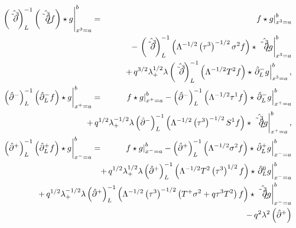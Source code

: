 \documentclass[a4paper,11pt,oneside]{article}
\begin{document}
\begin{eqnarray}
\left. \left( \hat{\tilde{\partial}^{3}}\right) _{L}^{-1}\left( \hat{\tilde{%
\partial}_{L}^{3}}f\right) \star g\right| _{x^{3}=a}^{b} &=&\left. f\star
g\right| _{x^{3}=a}^{b} \\
&&\hspace*{-3.cm}-\,\left( \hat{\tilde{\partial}^{3}}\right)
_{L}^{-1}\left( \Lambda ^{-1/2}\left( \tau ^{3}\right) ^{-1/2}\sigma
^{2}f\right) \star \left. \hat{\tilde{\partial}_{L}^{3}}g\right|
_{x^{3}=a}^{b}  \nonumber \\
&&\hspace*{-3.cm}+\,q^{3/2}\lambda _{+}^{1/2}\lambda \left( \hat{\tilde{%
\partial}^{3}}\right) _{L}^{-1}\left( \Lambda ^{-1/2}T^{2}f\right) \star
\left. \hat{\partial}_{L}^{-}g\right| _{x^{3}=a}^{b},  \nonumber \\
\left. \left( \hat{\partial}^{-}\right) _{L}^{-1}\left( \hat{\partial}%
_{L}^{-}f\right) \star g\right| _{x^{+}=a}^{b} &=&\left. f\star g\right|
_{x^{+}=a}^{b}-\left( \hat{\partial}^{-}\right) _{L}^{-1}\left( \Lambda
^{-1/2}\tau ^{1}f\right) \star \left. \hat{\partial}_{L}^{-}g\right|
_{x^{+}=a}^{b}  \nonumber \\
&&\hspace*{-3.cm}+\,q^{1/2}\lambda _{+}^{-1/2}\lambda \left( \hat{\partial}%
^{-}\right) _{L}^{-1}\left( \Lambda ^{-1/2}\left( \tau ^{3}\right)
^{-1/2}S^{1}f\right) \star \left. \hat{\tilde{\partial}_{L}^{3}}g\right|
_{x^{+}=a}^{b},  \nonumber \\
\left. \left( \hat{\partial}^{+}\right) _{L}^{-1}\left( \hat{\partial}%
_{L}^{+}f\right) \star g\right| _{x^{-}=a}^{b} &=&\left. f\star g\right|
_{x^{-}=a}^{b}-\left( \hat{\partial}^{+}\right) _{L}^{-1}\left( \Lambda
^{-1/2}\sigma ^{2}f\right) \star \left. \hat{\partial}_{L}^{+}g\right|
_{x^{-}=a}^{b}  \nonumber \\
&&\hspace*{-3.cm}+\,q^{1/2}\lambda _{+}^{1/2}\lambda \left( \hat{\partial}%
^{+}\right) _{L}^{-1}\left( \Lambda ^{-1/2}T^{2}\left( \tau ^{3}\right)
^{1/2}f\right) \star \left. \hat{\partial}_{L}^{0}g\right| _{x^{-}=a}^{b} 
\nonumber \\
&&\hspace*{-3.cm}+\,q^{1/2}\lambda _{+}^{-1/2}\lambda \left( \hat{\partial}%
^{+}\right) _{L}^{-1}\left( \Lambda ^{-1/2}\left( \tau ^{3}\right)
^{-1/2}\left( T^{+}\sigma ^{2}+q\tau ^{3}T^{2}\right) f\right) \star \left. 
\hat{\tilde{\partial}_{L}^{3}}g\right| _{x^{-}=a}^{b}  \nonumber \\
&&\hspace*{-3.cm}-\,q^{2}\lambda ^{2}\left( \hat{\partial}^{+}\right)

\end{eqnarray}
\end{document}
